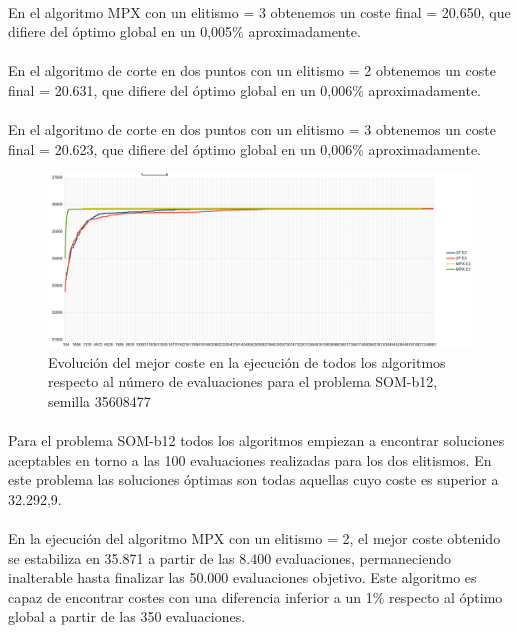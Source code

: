 	\paragraph{}En el algoritmo MPX con un elitismo = 3 obtenemos un coste final = 20.650, que difiere del óptimo global en un 0,005\% aproximadamente.
	
	\paragraph{}En el algoritmo de corte en dos puntos con un elitismo = 2 obtenemos un coste final = 20.631, que difiere del óptimo global en un 0,006\% aproximadamente.
	
	\paragraph{}En el algoritmo de corte en dos puntos con un elitismo = 3 obtenemos un coste final = 20.623, que difiere del óptimo global en un 0,006\% aproximadamente.

	\begin{figure}[H]
		\centering
		\includegraphics[scale=0.3]{img/35608477_SOM-b_12_n300_m90.png}
		\caption{Evolución del mejor coste en la ejecución de todos los algoritmos respecto al número de evaluaciones para el problema SOM-b12, semilla 35608477}
		\label{SOM-b_12_historico}
	\end{figure}

	\paragraph{}Para el problema SOM-b12 todos los algoritmos empiezan a encontrar soluciones aceptables en torno a las 100 evaluaciones realizadas para los dos elitismos. En este problema las soluciones óptimas son todas aquellas cuyo coste es superior a 32.292,9.
	
	\paragraph{}En la ejecución del algoritmo MPX con un elitismo = 2, el mejor coste obtenido se estabiliza en 35.871 a partir de las 8.400 evaluaciones, permaneciendo inalterable hasta finalizar las 50.000 evaluaciones objetivo. Este algoritmo es capaz de encontrar costes con una diferencia inferior a un 1\% respecto al óptimo global a partir de las 350 evaluaciones.
	
